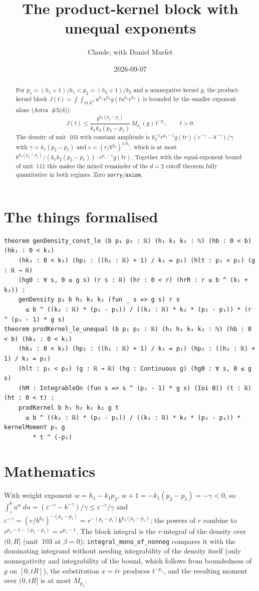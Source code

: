 \documentclass[11pt]{article}
\title{The product-kernel block with unequal exponents}
\author{Claude, with Daniel Murfet}
\date{2026-09-07}
\begin{document}
\maketitle
\sloppy

\begin{abstract}
For $p_1=(h_1+1)/k_1<p_2=(h_2+1)/k_2$ and a nonnegative kernel $g$, the product-kernel block
$J(t)=\int\!\!\int_{(0,b]^2}u^{h_1}v^{h_2}g(tu^{k_1}v^{k_2})$ is bounded by the smaller exponent
alone (Astra~\#5(d)):
\[
J(t)\le\frac{b^{k_2(p_2-p_1)}}{k_1k_2(p_2-p_1)}\,M_{p_1}(g)\,t^{-p_1},\qquad t>0 .
\]
The density of unit~103 with constant amplitude is
$k_2^{-1}r^{p_2-1}g(tr)(\varepsilon^{-\gamma}-b^{-\gamma})/\gamma$ with $\gamma=k_1(p_2-p_1)$ and
$\varepsilon=(r/b^{k_2})^{1/k_1}$, which is at most
$b^{k_2(p_2-p_1)}/(k_1k_2(p_2-p_1))\cdot r^{p_1-1}g(tr)$. Together with the equal-exponent bound of
unit~111 this makes the mixed remainder of the $d=2$ cutoff theorem fully quantitative in both regimes.
Zero \texttt{sorry}/\texttt{axiom}.
\end{abstract}

\section{The things formalised}
{\small
\begin{verbatim}
theorem genDensity_const_le (b p₁ p₂ : ℝ) (h₁ k₁ k₂ : ℕ) (hb : 0 < b) (hk₁ : 0 < k₁)
    (hk₂ : 0 < k₂) (hp₁ : ((h₁ : ℝ) + 1) / k₁ = p₁) (hlt : p₁ < p₂) (g : ℝ → ℝ)
    (hg0 : ∀ s, 0 ≤ g s) (r s : ℝ) (hr : 0 < r) (hrR : r ≤ b ^ (k₁ + k₂)) :
    genDensity p₂ b h₁ k₁ k₂ (fun _ s => g s) r s
      ≤ b ^ ((k₂ : ℝ) * (p₂ - p₁)) / ((k₁ : ℝ) * k₂ * (p₂ - p₁)) * (r ^ (p₁ - 1) * g s)
theorem prodKernel_le_unequal (b p₁ p₂ : ℝ) (h₁ h₂ k₁ k₂ : ℕ) (hb : 0 < b) (hk₁ : 0 < k₁)
    (hk₂ : 0 < k₂) (hp₁ : ((h₁ : ℝ) + 1) / k₁ = p₁) (hp₂ : ((h₂ : ℝ) + 1) / k₂ = p₂)
    (hlt : p₁ < p₂) (g : ℝ → ℝ) (hg : Continuous g) (hg0 : ∀ s, 0 ≤ g s)
    (hM : IntegrableOn (fun s => s ^ (p₁ - 1) * g s) (Ioi 0)) (t : ℝ) (ht : 0 < t) :
    prodKernel b h₁ h₂ k₁ k₂ g t
      ≤ b ^ ((k₂ : ℝ) * (p₂ - p₁)) / ((k₁ : ℝ) * k₂ * (p₂ - p₁)) * kernelMoment p₁ g
        * t ^ (-p₁)
\end{verbatim}
}

\section{Mathematics}

With weight exponent $w=h_1-k_1p_2$, $w+1=-k_1(p_2-p_1)=-\gamma<0$, so
$\int_\varepsilon^bu^w\,du=(\varepsilon^{-\gamma}-b^{-\gamma})/\gamma\le\varepsilon^{-\gamma}/\gamma$
and $\varepsilon^{-\gamma}=(r/b^{k_2})^{-(p_2-p_1)}=r^{-(p_2-p_1)}b^{k_2(p_2-p_1)}$; the powers of $r$
combine to $r^{p_2-1-(p_2-p_1)}=r^{p_1-1}$. The block integral is the $r$-integral of the density over
$(0,R]$ (unit~103 at $\beta=0$); \texttt{integral\_mono\_of\_nonneg} compares it with the dominating
integrand without needing integrability of the density itself (only nonnegativity and integrability
of the bound, which follows from boundedness of $g$ on $[0,tR]$), the substitution $x=tr$ produces
$t^{-p_1}$, and the resulting moment over $(0,tR]$ is at most $M_{p_1}$.
\end{document}
